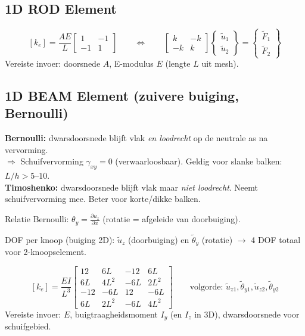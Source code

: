 \documentclass[a4paper,10pt]{article}
\begin{document}
\subsection*{1D ROD Element}

\begin{formulebox}
\[
  [k_e] = \frac{AE}{L}\begin{bmatrix} 1 & -1 \\ -1 & 1 \end{bmatrix}
  \qquad \Leftrightarrow \qquad
  \begin{bmatrix} k & -k \\ -k & k \end{bmatrix}\begin{Bmatrix}\tilde{u}_1\\\tilde{u}_2\end{Bmatrix} = \begin{Bmatrix}\tilde{F}_1\\\tilde{F}_2\end{Bmatrix}
\]
Vereiste invoer: doorsnede $A$, E-modulus $E$ (lengte $L$ uit mesh).
\end{formulebox}

\subsection*{1D BEAM Element (zuivere buiging, Bernoulli)}

\begin{exambox}
\textbf{Bernoulli:} dwarsdoorsnede blijft vlak \emph{en loodrecht} op de neutrale as na vervorming.\\
$\Rightarrow$ Schuifvervorming $\gamma_{xy} = 0$ (verwaarloosbaar). Geldig voor slanke balken: $L/h > 5\text{--}10$.\\[3pt]
\textbf{Timoshenko:} dwarsdoorsnede blijft vlak maar \emph{niet loodrecht}. Neemt schuifvervorming mee. Beter voor korte/dikke balken.
\end{exambox}

Relatie Bernoulli: $\theta_y = \frac{\partial u_z}{\partial x}$ (rotatie = afgeleide van doorbuiging).

DOF per knoop (buiging 2D): $\tilde{u}_z$ (doorbuiging) en $\tilde{\theta}_y$ (rotatie) $\to$ 4 DOF totaal voor 2-knoopselement.

\begin{formulebox}
\[
  [k_e] = \frac{EI}{L^3}\begin{bmatrix}
    12 & 6L & -12 & 6L \\
    6L & 4L^2 & -6L & 2L^2 \\
    -12 & -6L & 12 & -6L \\
    6L & 2L^2 & -6L & 4L^2
  \end{bmatrix}
  \qquad \text{volgorde: } \tilde{u}_{z1},\tilde{\theta}_{y1},\tilde{u}_{z2},\tilde{\theta}_{y2}
\]
Vereiste invoer: $E$, buigtraagheidsmoment $I_y$ (en $I_z$ in 3D), dwarsdoorsnede voor schuifgebied.
\end{formulebox}
\end{document}
